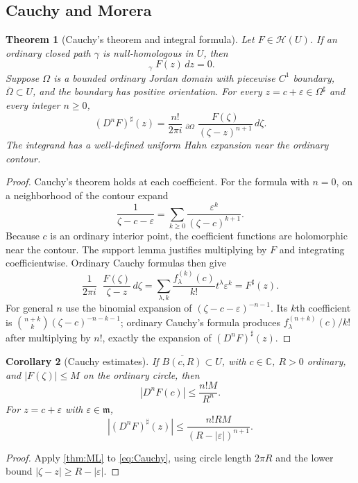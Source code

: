 \documentclass[11pt,letterpaper]{article}
\newtheorem{theorem}{Theorem}[section]
\newtheorem{corollary}[theorem]{Corollary}
\theoremstyle{definition}
\theoremstyle{remark}
\newcommand{\C}{\mathbb C}
\newcommand{\HH}{\mathcal H}
\newcommand{\mm}{\mathfrak m}
\newcommand{\HCoint}{\mathop{\oint^{\!H}}\nolimits}
\newcommand{\sh}{^{\sharp}}
\numberwithin{equation}{section}
\begin{document}
\subsection{Cauchy and Morera}
\begin{theorem}[Cauchy's theorem and integral formula]\label{thm:Cauchy}
Let $F\in\HH(U)$.
If an ordinary closed path $\gamma$ is null-homologous in $U$, then
\[
 \HCoint_\gamma F(z)\,dz=0.
\]
Suppose $\Omega$ is a bounded ordinary Jordan domain with piecewise $C^1$ boundary, $\overline\Omega\subset U$, and the boundary has positive orientation. For every $z=c+\varepsilon\in\Omega\sh$ and every integer $n\ge0$,
\begin{equation}\label{eq:Cauchy}
 (D^nF)\sh(z)
 =\frac{n!}{2\pi i}\HCoint_{\partial\Omega}
       \frac{F(\zeta)}{(\zeta-z)^{n+1}}\,d\zeta.
\end{equation}
The integrand has a well-defined uniform Hahn expansion near the ordinary contour.
\end{theorem}
\begin{proof}
Cauchy's theorem holds at each coefficient. For the formula with $n=0$, on a neighborhood of the contour expand
\[
 \frac1{\zeta-c-\varepsilon}
   =\sum_{k\ge0}\frac{\varepsilon^k}{(\zeta-c)^{k+1}}.
\]
Because $c$ is an ordinary interior point, the coefficient functions are holomorphic near the contour. The support lemma justifies multiplying by $F$ and integrating coefficientwise. Ordinary Cauchy formulas then give
\[
 \frac1{2\pi i}\HCoint\frac{F(\zeta)}{\zeta-z}\,d\zeta
 =\sum_{\lambda,k}\frac{f_\lambda^{(k)}(c)}{k!}t^\lambda\varepsilon^k
 =F\sh(z).
\]
For general $n$ use the binomial expansion of $(\zeta-c-\varepsilon)^{-n-1}$. Its $k$th coefficient is $\binom{n+k}{k}(\zeta-c)^{-n-k-1}$; ordinary Cauchy's formula produces $f_\lambda^{(n+k)}(c)/k!$ after multiplying by $n!$, exactly the expansion of $(D^nF)\sh(z)$.
\end{proof}

\begin{corollary}[Cauchy estimates]\label{cor:Cauchyestimate}
If $\overline{B(c,R)}\subset U$, with $c\in\C$, $R>0$ ordinary, and $|F(\zeta)|\le M$ on the ordinary circle, then
\[
 |D^nF(c)|\le\frac{n!M}{R^n}.
\]
For $z=c+\varepsilon$ with $\varepsilon\in\mm$,
\[
 |(D^nF)\sh(z)|
 \le \frac{n!RM}{(R-|\varepsilon|)^{n+1}}.
\]
\end{corollary}
\begin{proof}
Apply \cref{thm:ML} to \eqref{eq:Cauchy}, using circle length $2\pi R$ and the lower bound $|\zeta-z|\ge R-|\varepsilon|$.
\end{proof}
\end{document}

